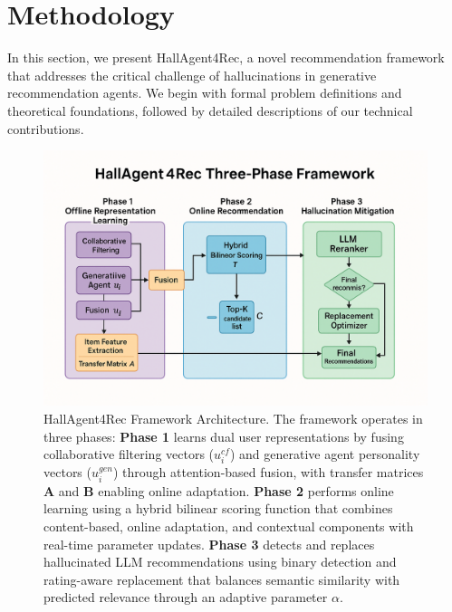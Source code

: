 \documentclass[acmsmall]{acmart}
\begin{document}

\section{Methodology}
In this section, we present HallAgent4Rec, a novel recommendation framework that addresses the critical challenge of hallucinations in generative recommendation agents. We begin with formal problem definitions and theoretical foundations, followed by detailed descriptions of our technical contributions.

\begin{figure}
    \centering
    \includegraphics[width=\linewidth]{framework (1).png}
    \caption{HallAgent4Rec Framework Architecture. The framework operates in three phases: \textbf{Phase 1} learns dual user representations by fusing collaborative filtering vectors ($u^{cf}_i$) and generative agent personality vectors ($u^{gen}_i$) through attention-based fusion, with transfer matrices $\mathbf{A}$ and $\mathbf{B}$ enabling online adaptation. \textbf{Phase 2} performs online learning using a hybrid bilinear scoring function that combines content-based, online adaptation, and contextual components with real-time parameter updates. \textbf{Phase 3} detects and replaces hallucinated LLM recommendations using binary detection and rating-aware replacement that balances semantic similarity with predicted relevance through an adaptive parameter $\alpha$.}
    \label{fig:framework}
\end{figure}
\end{document}
